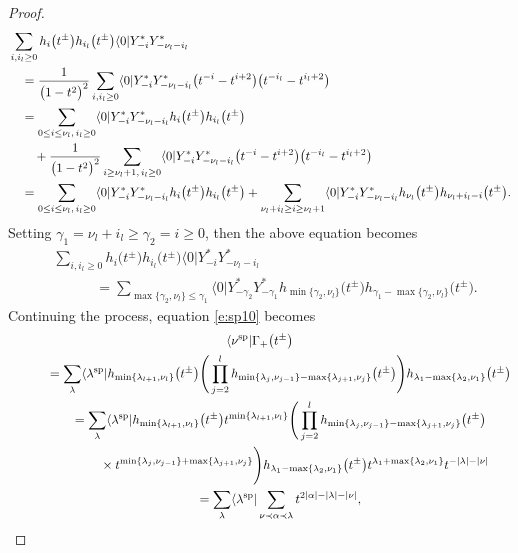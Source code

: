 \documentclass[pdftex]{sigma}
\numberwithin{equation}{section}
\begin{document}
\begin{proof}
\begin{align*}
\notag&\sum_{i,i_l\geq 0}h_i\big(t^{\pm}\big)h_{i_l}\big(t^{\pm}\big)\langle 0|Y^*_{-i}Y^*_{-\nu_l-i_l}\\
\notag&\quad{}=\frac{1}{\big(1-t^2\big)^2}\sum_{i,i_l\geq 0}\langle 0|Y^*_{-i}Y^*_{-\nu_l-i_l}\big(t^{-i}-t^{i+2}\big)\big(t^{-i_l}-t^{i_l+2}\big)\\
\notag&\quad{}=\sum_{0\leq i\leq \nu_l,\,i_l\geq 0}\langle 0|Y^*_{-i}Y^*_{-\nu_l-i_l}h_i\big(t^{\pm}\big)h_{i_l}\big(t^{\pm}\big)\\ \notag
&\qquad{}+\frac{1}{\big(1-t^2\big)^2}\sum_{i\geq \nu_l+1,\,i_l\geq 0}\langle 0|Y^*_{-i}Y^*_{-\nu_l-i_l}\big(t^{-i}-t^{i+2}\big)\big(t^{-i_l}-t^{i_l+2}\big)\\
\notag&\quad{}=\sum_{0\leq i\leq \nu_l,\,i_l\geq 0}\langle 0|Y^*_{-i}Y^*_{-\nu_l-i_l}h_i\big(t^{\pm}\big)h_{i_l}\big(t^{\pm}\big)+\sum_{\nu_l+i_l\geq i\geq \nu_l+1}\langle 0|Y^*_{-i}Y^*_{-\nu_l-i_l}h_{\nu_l}\big(t^{\pm}\big)h_{\nu_l+i_l-i}\big(t^{\pm}\big).
\end{align*}
Setting $\gamma_1=\nu_l+i_l\geq \gamma_2=i\geq 0$, then the above equation becomes
\begin{align*}
&\sum_{i,i_l\geq 0}h_i\big(t^{\pm}\big)h_{i_l}\big(t^{\pm}\big)\langle 0|Y^*_{-i}Y^*_{-\nu_l-i_l}\\
&\qquad\quad{}=\sum_{\max\{\gamma_2,\nu_l\}\leq \gamma_1}\langle 0|Y^*_{-\gamma_2}Y^*_{-\gamma_1}h_{\min\{\gamma_2,\nu_l\}}\big(t^{\pm}\big)h_{\gamma_1-\max\{\gamma_2,\nu_l\}}\big(t^{\pm}\big).
\end{align*}
Continuing the process, equation \eqref{e:sp10} becomes
\begin{gather*}
 \langle\nu^{\rm sp}|\Gamma_+\big(t^{\pm}\big)\\
 \qquad\quad{}=\sum_{\lambda}\langle\lambda^{\rm sp}|h_{\min\{\lambda_{l+1},\nu_l\}}\big(t^{\pm}\big)\Bigg(\prod^{l}_{j=2}h_{\min\{\lambda_j,\nu_{j-1}\}-\max\{\lambda_{j+1},\nu_j\}}\big(t^{\pm}\big)\Bigg)h_{\lambda_1-\max\{\lambda_2,\nu_1\}}\big(t^{\pm}\big)\\
 \qquad\quad{}=\sum_{\lambda}\langle\lambda^{\rm sp}|h_{\min\{\lambda_{l+1},\nu_l\}}\big(t^{\pm}\big)t^{\min\{\lambda_{l+1},\nu_l\}}\Bigg(\prod^{l}_{j=2}h_{\min\{\lambda_j,\nu_{j-1}\}-\max\{\lambda_{j+1},\nu_j\}}\big(t^{\pm}\big)\\
 \qquad\quad\hphantom{=\sum_{\lambda}}{}
\times t^{\min\{\lambda_j,\nu_{j-1}\}+\max\{\lambda_{j+1},\nu_j\}}\Bigg)h_{\lambda_1-\max\{\lambda_2,\nu_1\}}\big(t^{\pm}\big)t^{\lambda_1+\max\{\lambda_2,\nu_1\}} t^{-|\lambda|-|\nu|}\\ \notag
 \qquad\quad{}=\sum_{\lambda}\langle\lambda^{\rm sp}|\sum_{\nu\prec\alpha\prec\lambda}t^{2|\alpha|-|\lambda|-|\nu|},

\end{gather*}
\end{proof}
\end{document}
